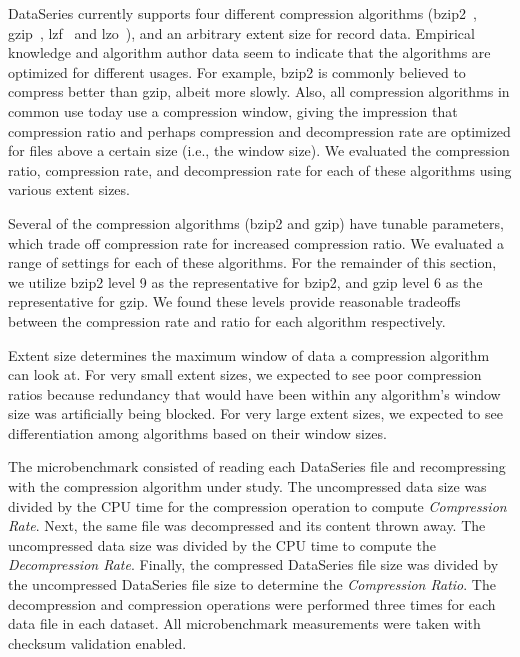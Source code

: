 \documentclass{acm_proc_article-sp}
\begin{document}

DataSeries currently supports four different compression algorithms
(bzip2~\cite{BZIP}, gzip~\cite{GZIP}, lzf~\cite{LZF} and lzo~\cite{LZO}),
and an arbitrary extent size for record data.  Empirical knowledge and
algorithm author data seem to indicate that the algorithms are
optimized for different usages.  For example, bzip2 is commonly
believed to compress better than gzip, albeit more slowly.  Also,
all compression algorithms in common use today use a compression
window, giving the impression that compression ratio and perhaps
compression and decompression rate are optimized for files above a
certain size (i.e., the window size).  
We evaluated the compression ratio, compression rate, 
and decompression rate for each of these algorithms
using various extent sizes.

Several of the compression algorithms (bzip2 and gzip)
have tunable parameters, which trade 
off compression rate for increased compression ratio.
We evaluated a range of settings for each of these algorithms.  
For the remainder of this section, we utilize bzip2 level 9 as
the representative for bzip2, and gzip level 6 as the representative
for gzip.  We found these levels provide reasonable tradeoffs
between the compression rate and ratio for each algorithm respectively.

Extent size determines the maximum window of data a compression
algorithm can look at.  For very small extent sizes, we expected to
see poor compression ratios because redundancy that would have been
within any algorithm's window size was artificially being blocked.
For very large extent sizes, we expected to see differentiation among
algorithms based on their window sizes.

The microbenchmark consisted of reading each DataSeries file
and recompressing with the compression
algorithm under study.  The uncompressed data size was divided by the CPU time for the compression
operation  to compute {\em
Compression Rate}.  Next, the same file was decompressed and its
content thrown away.  The uncompressed data size was divided by the CPU time 
to compute the {\em Decompression Rate}.  
Finally, the compressed DataSeries file size was
divided by the uncompressed DataSeries file size to determine the {\em
Compression Ratio}.  The decompression and compression operations were
performed three times for each data file in each dataset.  All microbenchmark 
measurements were taken with checksum validation enabled.
\end{document}
